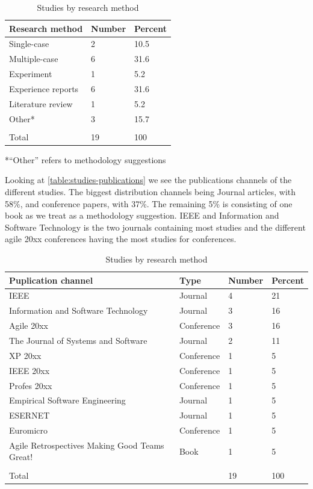 \documentclass[12pt]{article}
\begin{document}
\begin{table}[!h]
	\centering
	\caption{Studies by research method}
	\label{table:studies-research-methods}
	\begin{tabular}{ p{} p{} p{}}
		\hline
		Research method & Number & Percent \\ \hline
		Single-case & 2 & 10.5 \\
		Multiple-case & 6 & 31.6 \\
		Experiment & 1 & 5.2 \\
		Experience reports & 6 & 31.6 \\
		Literature review & 1 & 5.2 \\
		Other* & 3 & 15.7 \\
		\\
		Total & 19 & 100 \\ \hline
	\end{tabular}
	*``Other'' refers to methodology suggestions
\end{table}

Looking at \autoref{table:studies-publications} we see the publications channels of the different studies. The biggest distribution channels being Journal articles, with 58\%, and conference papers, with 37\%. The remaining 5\% is consisting of one book as we treat as a methodology suggestion. IEEE and Information and Software Technology is the two journals containing most studies and the different agile 20xx conferences having the most studies for conferences. 

\begin{table}[!h]
	\centering
	\caption{Studies by research method}
	\label{table:studies-publications}
	\begin{tabular}{ p{} p{} p{} p{}}
		\hline
		Puplication channel & Type & Number & Percent \\ \hline
		IEEE & Journal & 4 & 21 \\
		Information and Software Technology & Journal & 3 & 16 \\
		Agile 20xx & Conference & 3 & 16 \\
		The Journal of Systems and Software & Journal & 2 & 11 \\
		XP 20xx & Conference & 1 & 5 \\
		IEEE  20xx & Conference & 1 & 5 \\
		Profes 20xx & Conference & 1 & 5 \\
		Empirical Software Engineering & Journal & 1 & 5 \\
		ESERNET & Journal & 1 & 5 \\
		Euromicro & Conference & 1 & 5 \\
		Agile Retrospectives Making Good Teams Great! & Book & 1 & 5 \\
		\\
		Total & & 19 & 100 \\ \hline
	\end{tabular}
\end{table}
\end{document}
